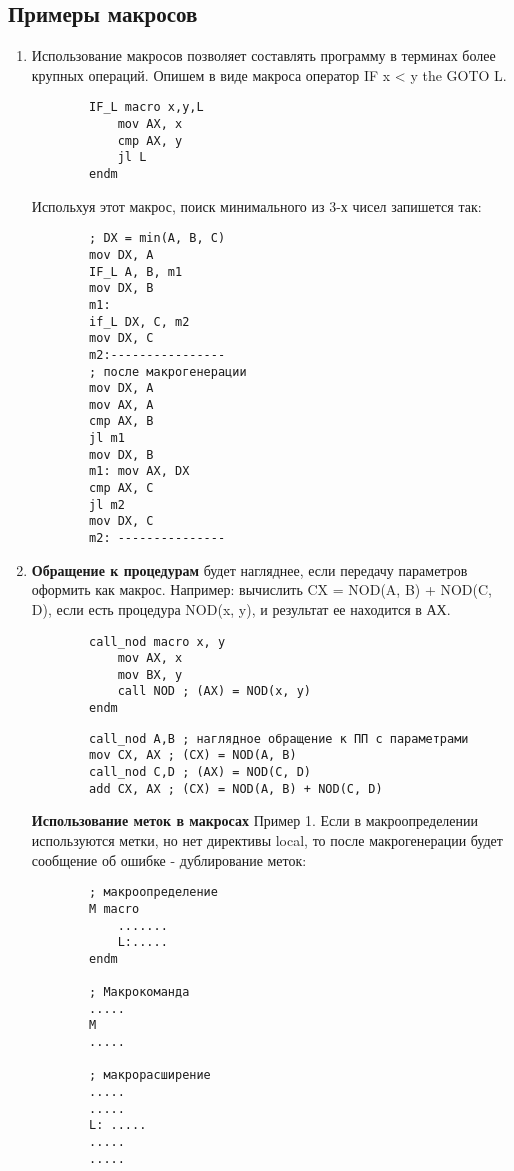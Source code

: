 \subsection{Примеры макросов}
\begin{enumerate}
    \item Использование макросов позволяет составлять программу в терминах более крупных операций. Опишем в виде макроса оператор IF x < y the GOTO L.
    \begin{verbatim}
        IF_L macro x,y,L
            mov AX, x
            cmp AX, y
            jl L
        endm
    \end{verbatim}
    Испольхуя этот макрос, поиск минимального из 3-х чисел запишется так:
    \begin{verbatim}
        ; DX = min(A, B, C)
        mov DX, A
        IF_L A, B, m1
        mov DX, B
        m1:
        if_L DX, C, m2
        mov DX, C
        m2:----------------
        ; после макрогенерации
        mov DX, A
        mov AX, A
        cmp AX, B
        jl m1
        mov DX, B
        m1: mov AX, DX
        cmp AX, C
        jl m2
        mov DX, C
        m2: ---------------
    \end{verbatim}
    \item \textbf{Обращение к процедурам} будет нагляднее, если передачу параметров оформить как макрос.
    Например: вычислить CX = NOD(A, B) + NOD(C, D), если есть процедура NOD(x, y), и результат ее находится в АХ.
    \begin{verbatim}
        call_nod macro x, y
            mov AX, x
            mov BX, y
            call NOD ; (AX) = NOD(x, y)
        endm
    \end{verbatim}

    \begin{verbatim}
        call_nod A,B ; наглядное обращение к ПП с параметрами
        mov CX, AX ; (CX) = NOD(A, B)
        call_nod C,D ; (AX) = NOD(C, D)
        add CX, AX ; (CX) = NOD(A, B) + NOD(C, D)
    \end{verbatim}

    \textbf{Использование меток в макросах}
    Пример 1. Если в макроопределении используются метки, но нет директивы local, то после макрогенерации будет сообщение об ошибке - дублирование меток:
    \begin{verbatim}
        ; макроопределение
        M macro
            .......
            L:.....
        endm

        ; Макрокоманда
        .....
        M
        .....

        ; макрорасширение
        .....
        .....
        L: .....
        .....
        .....
    \end{verbatim}
\end{enumerate}

